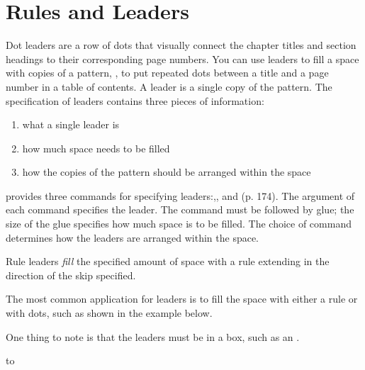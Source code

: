 \chapter{Rules and Leaders}

Dot leaders are a row of dots that visually connect the chapter titles and section headings to their corresponding page numbers. 
You can use leaders to fill a space with copies of a pattern,
\eg, to put repeated dots between a title and a page number in a table
of contents. A leader is a single copy of the pattern. The specification of
leaders contains three pieces of information:

\begin{enumerate}
\item  what a single leader is
\item  how much space needs to be filled
\item  how the copies of the pattern should be arranged within the space
\end{enumerate}

\begin{macro}{\leaders}
\tex  provides three commands for specifying leaders:,,
and (p. 174). The argument of each command specifies the
leader. The command must be followed by glue; the size of the glue specifies
how much space is to be filled. The choice of command determines how
the leaders are arranged within the space.
\end{macro}

Rule leaders \textit{fill} the specified amount of space with a rule extending in the direction of the skip
specified. 

The most common application for leaders is to fill the space with either a rule or with dots, such as shown in the example below.


One thing to note is that the leaders must be in a box, such as an .

\hbox to 

